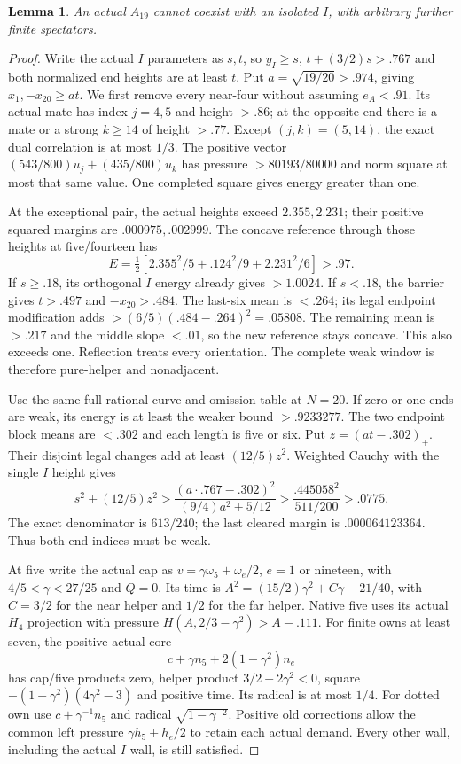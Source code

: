 \documentclass[11pt]{article}
\newtheorem{lemma}[theorem]{Lemma}
\theoremstyle{definition}
\theoremstyle{remark}
\begin{document}
\begin{lemma}
\label{app:tail:lem:A19I}
An actual $A_{19}$ cannot coexist with an isolated $I$, with
arbitrary further finite spectators.
\end{lemma}
\begin{proof}
Write the actual $I$ parameters as $s,t$, so $y_I\ge s$,
$t+(3/2)s>.767$ and both normalized end heights are at least $t$.
Put $a=\sqrt{19/20}>.974$, giving $x_1,-x_{20}\ge at$.
We first remove every near-four without assuming $e_A<.91$.
Its actual mate has index $j=4,5$ and height $>.86$; at the
opposite end there is a mate or a strong $k\ge14$ of height $>.77$.
Except $(j,k)=(5,14)$, the exact dual correlation is at most $1/3$.
The positive vector $(543/800)u_j+(435/800)u_k$ has pressure
$>80193/80000$ and norm square at most that same value.
One completed square gives energy greater than one.

At the exceptional pair, the actual heights exceed $2.355,2.231$;
their positive squared margins are $.000975,.002999$.
The concave reference through those heights at five/fourteen has
\[
 E=\tfrac12[2.355^2/5+.124^2/9+2.231^2/6]>.97.
\]
If $s\ge.18$, its orthogonal $I$ energy already gives $>1.0024$.
If $s<.18$, the barrier gives $t>.497$ and $-x_{20}>.484$.
The last-six mean is $<.264$; its legal endpoint modification adds
$>(6/5)(.484-.264)^2=.05808$. The remaining mean is $>.217$
and the middle slope $<.01$, so the new reference stays concave.
This also exceeds one. Reflection treats every orientation. The
complete weak window is therefore pure-helper and nonadjacent.

Use the same full rational curve and omission table at $N=20$.
If zero or one ends are weak, its energy is at least the weaker
bound $>.9233277$. The two endpoint block means are $<.302$ and
each length is five or six. Put $z=(at-.302)_+$.
Their disjoint legal changes add at least $(12/5)z^2$.
Weighted Cauchy with the single $I$ height gives
\[
 s^2+(12/5)z^2>
 {\frac{(a\cdot.767-.302)^2}{(9/4)a^2+5/12}}
 >{\frac{.445058^2}{511/200}}>.0775.
\]
The exact denominator is $613/240$; the last cleared margin is
$.000064123364$. Thus both end indices must be weak.

At five write the actual cap as $v=\gamma\omega_5+\omega_e/2$,
$e=1$ or nineteen, with $4/5<\gamma<27/25$ and $Q=0$.
Its time is $A^2=(15/2)\gamma^2+C\gamma-21/40$, with
$C=3/2$ for the near helper and $1/2$ for the far helper.
Native five uses its actual $H_4$ projection with pressure
$H(A,2/3-\gamma^2)>A-.111$.
For finite owns at least seven, the positive actual core
\[
 c+\gamma n_5+2(1-\gamma^2)n_e
\]
has cap/five products zero, helper product $3/2-2\gamma^2<0$,
square $-(1-\gamma^2)(4\gamma^2-3)$ and positive time.
Its radical is at most $1/4$. For dotted own use
$c+\gamma^{-1}n_5$ and radical $\sqrt{1-\gamma^{-2}}$.
Positive old corrections allow the common left pressure
$\gamma h_5+h_e/2$ to retain each actual demand. Every other
wall, including the actual $I$ wall, is still satisfied.


\end{proof}
\end{document}
